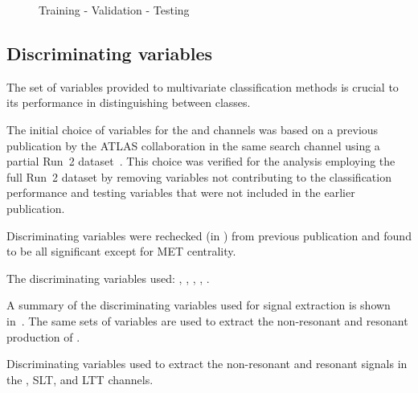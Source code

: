 


\begin{figure}[htbp]
  \centering

  \caption{Training - Validation - Testing}
  \label{fig:bla}
\end{figure}



\subsection{Discriminating variables}
\label{sec:mva_discriminating variables}

The set of variables provided to multivariate classification methods
is crucial to its performance in distinguishing between
classes.

The initial choice of variables for the \hadhad and \lephad channels
was based on a previous publication by the ATLAS collaboration in the
same search channel using a partial Run~2
dataset~\cite{HIGG-2016-16-witherratum}. This choice was verified for
the analysis employing the full Run~2 dataset by removing variables
not contributing to the classification performance and testing
variables that were not included in the earlier publication.










Discriminating variables were rechecked (in \hadhad) from previous
publication and found to be all significant except for MET centrality.




The discriminating variables used: \mMMC, \mBB, \mHH, \dRtautau, \dRbb.





A summary of the discriminating variables used for signal extraction
is shown in~. The same sets of variables are
used to extract the non-resonant and resonant production of \HH.

\begin{table}[htbp]
  \centering


  \caption{Discriminating variables used to extract the non-resonant
    and resonant \HH signals in the \hadhad, \lephad SLT, and \lephad
    LTT channels.}
  \label{tab:mva_inputvars}
\end{table}



